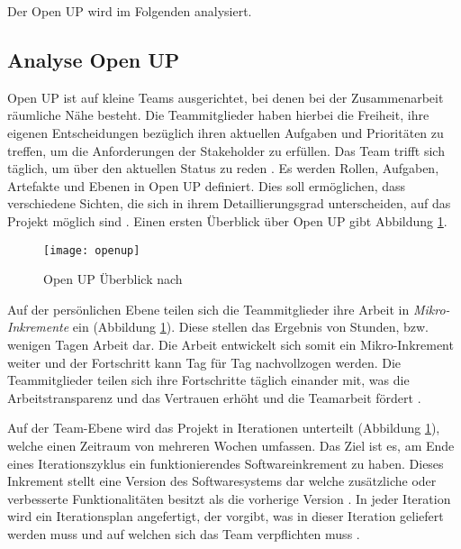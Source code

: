 Der Open UP wird im Folgenden analysiert.

\subsection{Analyse Open UP}

Open UP ist auf kleine Teams ausgerichtet, bei denen bei der Zusammenarbeit räumliche Nähe besteht. Die Teammitglieder haben hierbei die Freiheit, ihre eigenen Entscheidungen bezüglich ihren aktuellen Aufgaben und Prioritäten zu treffen, um die Anforderungen der Stakeholder zu erfüllen. Das Team trifft sich täglich, um über den aktuellen Status zu reden \cite{OpenUPProcess}.\newline
Es werden Rollen, Aufgaben, Artefakte und Ebenen in Open UP definiert. Dies soll ermöglichen, dass verschiedene Sichten, die sich in ihrem Detaillierungsgrad unterscheiden, auf das Projekt möglich sind \cite{freudenreichevaluierung}. Einen ersten Überblick über Open UP gibt Abbildung \ref{fig:openup}.

\begin{figure}[htp]
\begin{center}
  \texttt{[image: openup]} %
  \caption{Open UP Überblick nach \cite{eclipseopenup}}
  \label{fig:openup}
\end{center}
\end{figure}

Auf der persönlichen Ebene teilen sich die Teammitglieder ihre Arbeit in \textit{Mikro-Inkremente} ein (Abbildung \ref{fig:openup}). Diese stellen das Ergebnis von Stunden, bzw. wenigen Tagen Arbeit dar. Die Arbeit entwickelt sich somit ein Mikro-Inkrement weiter und der Fortschritt kann Tag für Tag nachvollzogen werden. Die Teammitglieder teilen sich ihre Fortschritte täglich einander mit, was die Arbeitstransparenz und das Vertrauen erhöht und die Teamarbeit fördert \cite{eclipseopenup}. \newline

Auf der Team-Ebene wird das Projekt in Iterationen unterteilt (Abbildung \ref{fig:openup}), welche einen Zeitraum von mehreren Wochen umfassen. Das Ziel ist es, am Ende eines Iterationszyklus ein funktionierendes Softwareinkrement zu haben. Dieses Inkrement stellt eine Version des Softwaresystems dar welche zusätzliche oder verbesserte Funktionalitäten besitzt als die vorherige Version \cite{Basem2010}.  In jeder Iteration wird ein Iterationsplan angefertigt,  der vorgibt, was in dieser Iteration geliefert werden muss und auf welchen sich das Team verpflichten muss \cite{freudenreichevaluierung}.

